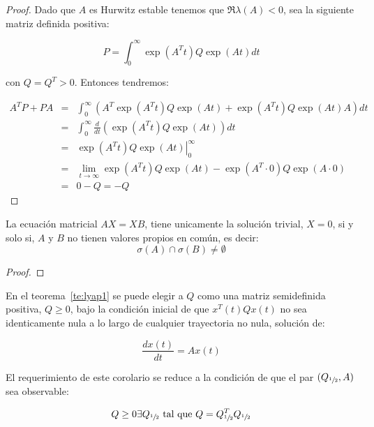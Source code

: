 \begin{proof}
        Dado que $A$ es Hurwitz estable tenemos que $\Re{\lambda(A)} < 0$, sea la siguiente matriz definida positiva:

        \begin{equation*}
            P = \int_0^{\infty} \exp{(A^Tt)} Q \exp(At) dt
        \end{equation*}

        con $Q = Q^T > 0$. Entonces tendremos:

        \begin{eqnarray*}
            A^T P + P A & = & \int_0^{\infty} \left( A^T \exp{(A^T t)} Q \exp{(At)} + \exp{(A^T t)} Q \exp{(At)} A \right) dt \\
            & = & \int_0^{\infty} \frac{d}{dt} \left( \exp{(A^T t)} Q \exp{(At)} \right) dt \\
            & = & \left. \exp{(A^T t)} Q \exp{(At)} \right|_0^{\infty} \\
            & = & \lim_{t \to \infty} \exp{(A^T t)} Q \exp{(At)} - \exp{(A^T \cdot 0)} Q \exp{(A \cdot 0)} \\
            & = & 0 - Q = - Q
        \end{eqnarray*}
    \end{proof}

    \begin{lema}
        La ecuación matricial $A X = X B$, tiene unicamente la solución trivial, $X=0$, si y solo si, $A$ y $B$ no tienen valores propios en común, es decir:
        \begin{equation*}
            \sigma(A) \cap \sigma(B) \ne \emptyset
        \end{equation*}
    \end{lema}

    \begin{proof}
    \end{proof}

    \begin{corolario} \label{co:lyap1}
        En el teorema~\ref{te:lyap1} se puede elegir a $Q$ como una matriz semidefinida positiva, $Q \ge 0$, bajo la condición inicial de que $x^T(t) Q x(t)$ no sea identicamente nula a lo largo de cualquier trayectoria no nula, solución de:

        \begin{equation*}
            \frac{d x(t)}{dt} = A x(t)
        \end{equation*}

        El requerimiento de este corolario se reduce a la condición de que el par $(Q_{\sfrac{1}{2}}, A)$ sea observable:

        \begin{equation*}
            Q \ge 0 \exists Q_{\sfrac{1}{2}} \text{ tal que } Q = Q_{\sfrac{1}{2}}^T Q_{\sfrac{1}{2}}
        \end{equation*}
    \end{corolario}

